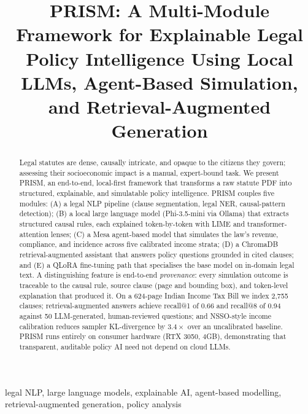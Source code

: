 \documentclass[conference]{IEEEtran}
\begin{document}
\title{PRISM: A Multi-Module Framework for Explainable Legal Policy
Intelligence Using Local LLMs, Agent-Based Simulation, and
Retrieval-Augmented Generation}

\author{
}

\maketitle

\begin{abstract}
Legal statutes are dense, causally intricate, and opaque to the citizens they
govern; assessing their socioeconomic impact is a manual, expert-bound task.
We present PRISM, an end-to-end, local-first framework that transforms a raw
statute PDF into structured, explainable, and simulatable policy intelligence.
PRISM couples five modules: (A) a legal NLP pipeline (clause segmentation,
legal NER, causal-pattern detection); (B) a local large language model
(Phi-3.5-mini via Ollama) that extracts structured causal rules, each explained
token-by-token with LIME and transformer-attention lenses; (C) a Mesa
agent-based model that simulates the law's revenue, compliance, and incidence
across five calibrated income strata; (D) a ChromaDB retrieval-augmented
assistant that answers policy questions grounded in cited clauses; and (E) a
QLoRA fine-tuning path that specialises the base model on in-domain legal text.
A distinguishing feature is end-to-end \emph{provenance}: every simulation
outcome is traceable to the causal rule, source clause (page and bounding box),
and token-level explanation that produced it. On a 624-page Indian Income Tax
Bill we index 2{,}755 clauses; retrieval-augmented answers achieve recall@1 of
0.66 and recall@8 of 0.94 against 50 LLM-generated, human-reviewed questions;
and NSSO-style income calibration reduces sampler KL-divergence by
$3.4\times$ over an uncalibrated baseline. PRISM runs entirely on consumer
hardware (RTX 3050, 4GB), demonstrating that transparent, auditable policy AI
need not depend on cloud LLMs.
\end{abstract}

\begin{IEEEkeywords}
legal NLP, large language models, explainable AI, agent-based modelling,
retrieval-augmented generation, policy analysis
\end{IEEEkeywords}
\end{document}
